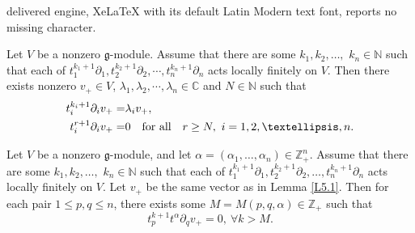 \documentclass[10pt,a4paper]{amsart}
\newcommand{\N}{\mathbb N}
\newcommand{\fg}{\mathfrak g}
\begin{document}
delivered engine, XeLaTeX with its default Latin Modern text font, reports no missing character.
\begin{lemma}\label{L5.1}
	Let $V$ be a nonzero $\fg$-module. Assume that there are  some $k_{1},k_{2},\dots,$ $k_{n}\in\N$ such that each of $t_{1}^{k_{1}+1}\partial_{1},t_{2}^{k_{2}+1}\partial_{2},\cdots,t_{n}^{k_{n}+1}\partial_{n}$
	acts locally finitely on $V$. Then   there exists nonzero $v_+\in V$, $\lambda_1,\lambda_2, \cdots, \lambda_n\in\mathbb{C}$  and $N\in\N$ such that 
	\[\aligned t_{i}^{k_{i}+1}\partial_{i}v_+=&\lambda_iv_+,\\
t_{i}^{r +1}\partial_{i}v_+=&0\quad \text{for all}\quad r \geq N,\ i=1,2,\dots,n.\endaligned\]
\end{lemma}

\begin{lemma}\label{CL-1}
	Let $V$ be a nonzero $\fg$-module, and let $\alpha=(\alpha_1,\dots,\alpha_n)\in\mathbb{Z}_+^n$. Assume that there are  some $k_{1},k_{2},\dots,$ $k_{n}\in\N$ such that each of $t_{1}^{k_{1}+1}\partial_{1},t_{2}^{k_{2}+1}\partial_{2},\dots, t_{n}^{k_{n}+1}\partial_{n}$
	acts locally finitely on $V$. Let $v_+$ be the same vector as in Lemma \ref{L5.1}. Then for each pair $1\le p,q\le n$, there exists some $M=M(p,q,\alpha)\in \mathbb{Z}_+$ such that 
	\begin{equation*}
		t_p^{k+1}t^\alpha\partial_qv_+=0,~\forall k>M.
	\end{equation*}
\end{lemma}
\end{document}
